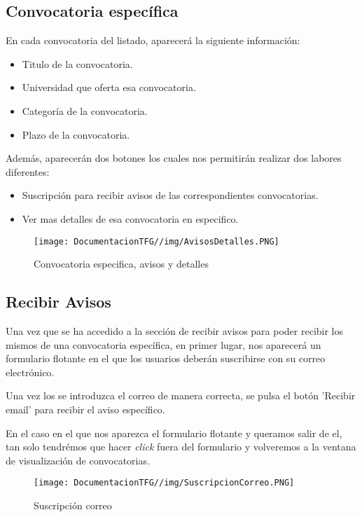 \subsection{Convocatoria específica}\label{convocatoria-especifica}
En cada convocatoria del listado, aparecerá la siguiente información:
\begin{itemize}
    \item Titulo de la convocatoria.
    \item Universidad que oferta esa convocatoria.
    \item Categoría de la convocatoria.
    \item Plazo de la convocatoria.
\end{itemize}

Además, aparecerán dos botones los cuales nos permitirán realizar dos labores diferentes:

\begin{itemize}
    \item Suscripción para recibir avisos de las correspondientes convocatorias.
    \item Ver mas detalles de esa convocatoria en especifico.
\end{itemize}

\begin{figure}[H]
    \centering
    \texttt{[image: DocumentacionTFG//img/AvisosDetalles.PNG]}
    \caption{Convocatoria especifica, avisos y detalles}
    \label{fig:avisos-detalles}
\end{figure}

\subsection{Recibir Avisos}
Una vez que se ha accedido a la sección de recibir avisos para poder recibir los mismos de una convocatoria específica, en primer lugar, nos aparecerá un formulario flotante en el que los usuarios deberán suscribirse con su correo electrónico.

Una vez los se introduzca el correo de manera correcta, se pulsa el botón 'Recibir email' para recibir el aviso específico.

En el caso en el que nos aparezca el formulario flotante y queramos salir de el, tan solo tendrémos que hacer \textit{click} fuera del formulario y volveremos a la ventana de visualización de convocatorias.

\begin{figure}[H]
    \centering
    \texttt{[image: DocumentacionTFG//img/SuscripcionCorreo.PNG]}
    \caption{Suscripción correo}
    \label{fig:suscripcion-correo}
\end{figure}

